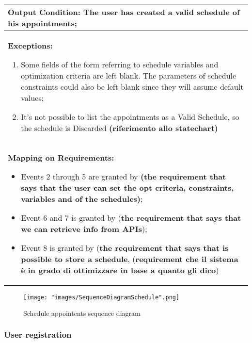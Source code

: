 \begin{longtable}{|p{14cm}|}
\textbf{Output Condition:} The user has created a valid schedule of his appointments; \\ \hline

\textbf{Exceptions:}
\begin{enumerate}
\item Some fields of the form referring to schedule variables and optimization criteria are left blank. The parameters of schedule constraints could also be left blank since they will assume default values;
\item It's not possible to list the appointments as a Valid Schedule, so the schedule is Discarded \textbf{(riferimento allo statechart)}
\end{enumerate} \\ \hline
\textbf{Mapping on Requirements:}
\begin{itemize}
\item Events 2 through 5 are granted by \textbf{(the requirement that says that the user can set the opt criteria, constraints, variables and  of the schedules)};
\item Event 6 and 7 is granted by (\textbf{the requirement that says that we can retrieve info from APIs});
\item Event 8 is granted by (\textbf{the requirement that says that is possible to store a schedule}, (\textbf{requirement che il sistema è in grado di ottimizzare in base a quanto gli dico}) 
\end{itemize}  \\ \hline

\end{longtable}

\begin{figure}[H]
\begin{center}
\texttt{[image: "images/SequenceDiagramSchedule".png]}
\caption{Schedule appointents sequence diagram}

\label{img:seqDiagrAppEditing00}
\end{center}
\end{figure}

\subsubsection{User registration} \label{usecase:User registration}

